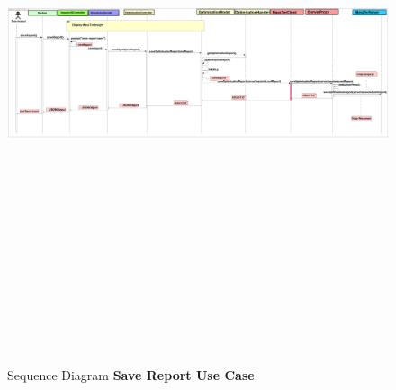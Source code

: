 	\begin{figure}[h]
		\centering
		\includegraphics[width=17.5cm,height=17cm]{SequenceDiagramSaveReport.png}
		\caption{Sequence Diagram \textbf{Save Report Use Case}}
	\end{figure}
	
	\pagebreak
	\clearpage
	\newpage 

